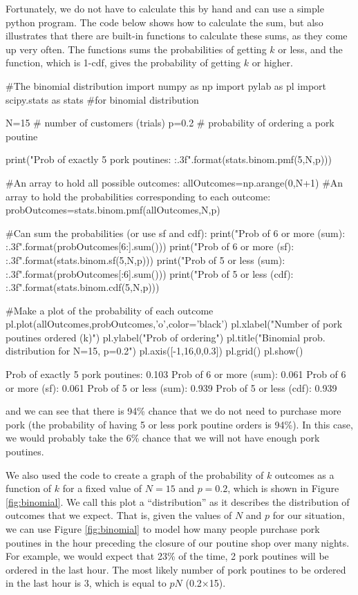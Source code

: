 Fortunately, we do not have to calculate this by hand and can use a simple python program. The code below shows how to calculate the sum, but also illustrates that there are built-in functions to calculate these sums, as they come up very often. The  functions sums the probabilities of getting $k$ or less, and the  function, which is 1-cdf, gives the probability of getting $k$ or higher.
\begin{python}[caption = Evaluating binomial probabilities] 
#The binomial distribution
import numpy as np
import pylab as pl
import scipy.stats as stats #for binomial distribution

N=15 # number of customers (trials)
p=0.2 # probability of ordering a pork poutine

print("Prob of exactly 5 pork poutines: {:.3f}".format(stats.binom.pmf(5,N,p)))

#An array to hold all possible outcomes:
allOutcomes=np.arange(0,N+1)
#An array to hold the probabilities corresponding to each outcome:
probOutcomes=stats.binom.pmf(allOutcomes,N,p)

#Can sum the probabilities (or use sf and cdf):
print("Prob of 6 or more (sum): {:.3f}".format(probOutcomes[6:].sum()))
print("Prob of 6 or more (sf): {:.3f}".format(stats.binom.sf(5,N,p)))
print("Prob of 5 or less (sum): {:.3f}".format(probOutcomes[:6].sum()))
print("Prob of 5 or less (cdf): {:.3f}".format(stats.binom.cdf(5,N,p)))

#Make a plot of the probability of each outcome
pl.plot(allOutcomes,probOutcomes,'o',color='black')
pl.xlabel("Number of pork poutines ordered (k)")
pl.ylabel("Prob of ordering")
pl.title("Binomial prob. distribution for N=15, p=0.2")
pl.axis([-1,16,0,0.3])
pl.grid()
pl.show()
\end{python}
\begin{poutput}
Prob of exactly 5 pork poutines: 0.103
Prob of 6 or more (sum): 0.061
Prob of 6 or more (sf): 0.061
Prob of 5 or less (sum): 0.939
Prob of 5 or less (cdf): 0.939
\end{poutput}
and we can see that there is 94\% chance that we do not need to purchase more pork (the probability of having 5 or less pork poutine orders is 94\%). In this case, we would probably take the 6\% chance that we will not have enough pork poutines.

We also used the code to create a graph of the probability of $k$ outcomes as a function of $k$ for a fixed value of $N=15$ and $p=0.2$, which is shown in Figure \ref{fig:binomial}. We call this plot a ``distribution'' as it describes the distribution of outcomes that we expect. That is, given the values of $N$ and $p$ for our situation, we can use Figure \ref{fig:binomial} to model how many people purchase pork poutines in the hour preceding the closure of our poutine shop over many nights. For example, we would expect that 23\% of the time, 2 pork poutines will be ordered in the last hour. The most likely number of pork poutines to be ordered in the last hour is 3, which is equal to $pN$ (0.2$\times$15).

